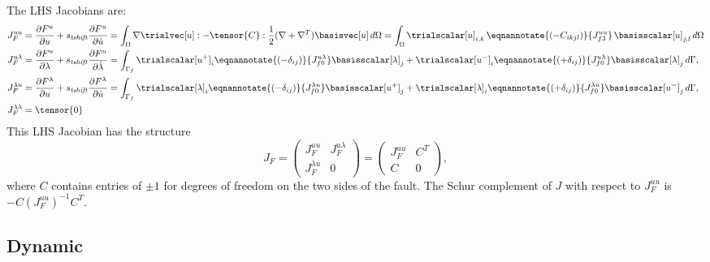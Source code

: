 The LHS Jacobians are:
\begin{align}
  J_F^{uu} &= \frac{\partial F^u}{\partial u} + s_\mathit{tshift} \frac{\partial F^u}{\partial \dot{u}}
      = \int_\Omega \nabla \trialvec[u] : -\tensor{C} : \frac{1}{2}(\nabla + \nabla^T)\basisvec[u] 
\, d\Omega 
      = \int_\Omega \trialscalar[u]_{i,k} \, \eqnannotate{\left( -C_{ikjl} \right)}{J_{f3}^{uu}} \, \basisscalar[u]_{j,l}\, d\Omega \\
  J_F^{u\lambda} &= \frac{\partial F^u}{\partial \lambda} + s_\mathit{tshift} \frac{\partial F^u}{\partial \dot{\lambda}}
      = \int_{\Gamma_{f}} \trialscalar[u^+]_i \eqnannotate{\left(-\delta_{ij}\right)}{J^{u\lambda}_{f0}} \basisscalar[\lambda]_j
                   + \trialscalar[u^-]_i \eqnannotate{\left(+\delta_{ij}\right)}{J^{u\lambda}_{f0}} \basisscalar[\lambda]_j\, d\Gamma, \\
  J_F^{\lambda u} &= \frac{\partial F^\lambda}{\partial u} + s_\mathit{tshift} \frac{\partial F^\lambda}{\partial \dot{u}}
      = \int_{\Gamma_{f}} \trialscalar[\lambda]_i 
                    \eqnannotate{\left(-\delta_{ij}\right)}{J^{\lambda u}_{f0}} \basisscalar[u^+]_j
                    + \trialscalar[\lambda]_i \eqnannotate{\left(+\delta_{ij}\right)}{J^{\lambda u}_{f0}} \basisscalar[u^-]_j \, d\Gamma, \\
  J_F^{\lambda \lambda} &= \tensor{0}
\end{align}
This LHS Jacobian has the structure
\begin{equation}
  J_F = \left( \begin{array} {cc} J_F^{uu} & J_F^{u\lambda} \\ J_F^{\lambda u} & 0 \end{array} \right)
      = \left( \begin{array} {cc} J_F^{uu} & C^T \\ C & 0 \end{array} \right),
\end{equation}
where $C$ contains entries of $\pm 1$ for degrees of freedom on the two sides of the fault. The Schur complement of $J$ with respect to $J_F^{uu}$ is $-C\left(J_F^{uu}\right)^{-1}C^T$.


\subsection{Dynamic}

